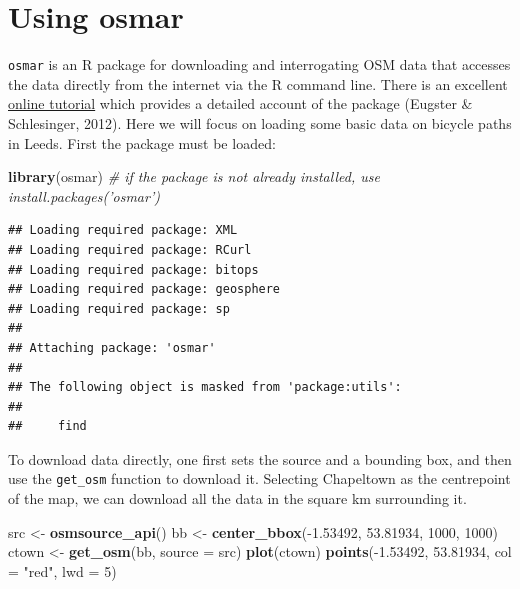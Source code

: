 \documentclass[]{article}
\newenvironment{Shaded}{}{}
\newcommand{\KeywordTok}[1]{\textcolor[rgb]{0.00,0.44,0.13}{\textbf{{#1}}}}
\newcommand{\DataTypeTok}[1]{\textcolor[rgb]{0.56,0.13,0.00}{{#1}}}
\newcommand{\DecValTok}[1]{\textcolor[rgb]{0.25,0.63,0.44}{{#1}}}
\newcommand{\FloatTok}[1]{\textcolor[rgb]{0.25,0.63,0.44}{{#1}}}
\newcommand{\StringTok}[1]{\textcolor[rgb]{0.25,0.44,0.63}{{#1}}}
\newcommand{\CommentTok}[1]{\textcolor[rgb]{0.38,0.63,0.69}{\textit{{#1}}}}
\newcommand{\NormalTok}[1]{{#1}}
\begin{document}
\section{Using osmar}

\texttt{osmar} is an R package for downloading and interrogating OSM
data that accesses the data directly from the internet via the R command
line. There is an excellent
\href{http://journal.r-project.org/archive/2013-1/eugster-schlesinger.pdf}{online
tutorial} which provides a detailed account of the package (Eugster \&
Schlesinger, 2012). Here we will focus on loading some basic data on
bicycle paths in Leeds. First the package must be loaded:

\begin{Shaded}
\begin{Highlighting}[]
\KeywordTok{library}\NormalTok{(osmar)  }\CommentTok{# if the package is not already installed, use install.packages('osmar')}
\end{Highlighting}
\end{Shaded}

\begin{verbatim}
## Loading required package: XML
## Loading required package: RCurl
## Loading required package: bitops
## Loading required package: geosphere
## Loading required package: sp
## 
## Attaching package: 'osmar'
## 
## The following object is masked from 'package:utils':
## 
##     find
\end{verbatim}

To download data directly, one first sets the source and a bounding box,
and then use the \texttt{get\_osm} function to download it. Selecting
Chapeltown as the centrepoint of the map, we can download all the data
in the square km surrounding it.

\begin{Shaded}
\begin{Highlighting}[]
\NormalTok{src <- }\KeywordTok{osmsource_api}\NormalTok{()}
\NormalTok{bb <- }\KeywordTok{center_bbox}\NormalTok{(-}\FloatTok{1.53492}\NormalTok{, }\FloatTok{53.81934}\NormalTok{, }\DecValTok{1000}\NormalTok{, }\DecValTok{1000}\NormalTok{)}
\NormalTok{ctown <- }\KeywordTok{get_osm}\NormalTok{(bb, }\DataTypeTok{source =} \NormalTok{src)}
\KeywordTok{plot}\NormalTok{(ctown)}
\KeywordTok{points}\NormalTok{(-}\FloatTok{1.53492}\NormalTok{, }\FloatTok{53.81934}\NormalTok{, }\DataTypeTok{col =} \StringTok{"red"}\NormalTok{, }\DataTypeTok{lwd =} \DecValTok{5}\NormalTok{)}
\end{Highlighting}
\end{Shaded}
\end{document}
